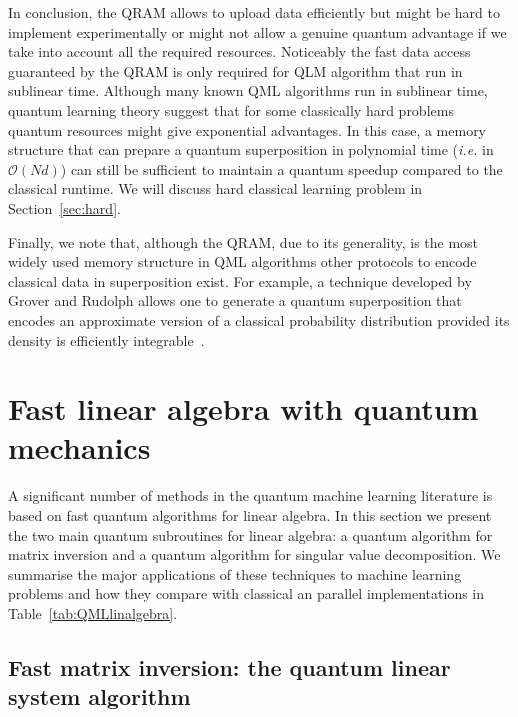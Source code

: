 \documentclass[a4paper, 11pt]{article}
\begin{document}

In conclusion, the QRAM allows to upload data efficiently but might be hard to implement experimentally or might not allow a genuine quantum advantage if we take into account all the required resources. Noticeably the fast data access guaranteed by the QRAM is only required for QLM algorithm that run in sublinear time. Although many known QML algorithms run in sublinear time, quantum learning theory suggest that for some classically hard problems quantum resources might give exponential advantages. In this case, a memory structure that can prepare a quantum superposition in polynomial time (\textit{i.e.} in $\mathcal{O}(Nd)$) can still be sufficient to maintain a quantum speedup compared to the classical runtime. We will discuss hard classical learning problem in Section~\ref{sec:hard}.

Finally, we note that, although the QRAM, due to its generality, is the most widely used memory structure in QML algorithms other protocols to encode classical data in superposition exist. For example, a technique developed by Grover and Rudolph allows one to generate a quantum superposition that encodes an approximate version of a classical probability distribution provided its density is efficiently integrable~\cite{grover2002creating}.

\section{Fast linear algebra with quantum mechanics}
\label{sec:linear}

A significant number of methods in the quantum machine learning literature is based on fast quantum algorithms for linear algebra. In this section we present the two main quantum subroutines for linear algebra: a quantum algorithm for matrix inversion and a quantum algorithm for singular value decomposition. We summarise the major applications of these techniques to machine learning problems and how they compare with classical an parallel implementations in Table~\ref{tab:QMLlinalgebra}.

\subsection*{Fast matrix inversion: the quantum linear system algorithm}
\end{document}
